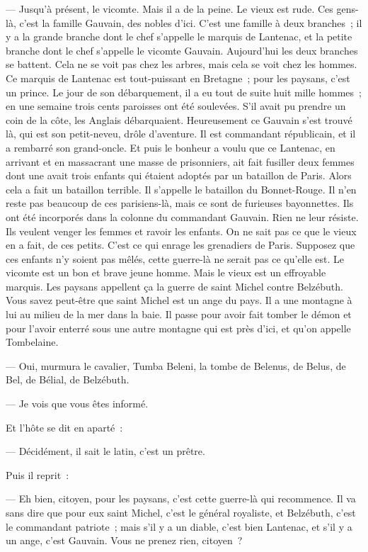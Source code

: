 \documentclass[french,twoside]{book} %
\begin{document}
— Jusqu’à présent, le vicomte. Mais il a de la peine. Le vieux est rude. Ces gens-là, c’est la famille Gauvain, des nobles d’ici. C’est une famille à deux branches ; il y a la grande branche dont le chef s’appelle le marquis de Lantenac, et la petite branche dont le chef s’appelle le vicomte Gauvain. Aujourd’hui les deux branches se battent. Cela ne se voit pas chez les arbres, mais cela se voit chez les hommes. Ce marquis de Lantenac est tout-puissant en Bretagne ; pour les paysans, c’est un prince. Le jour de son débarquement,  il a eu tout de suite huit mille hommes ; en une semaine trois cents paroisses ont été soulevées. S’il avait pu prendre un coin de la côte, les Anglais débarquaient. Heureusement ce Gauvain s’est trouvé là, qui est son petit-neveu, drôle d’aventure. Il est commandant républicain, et il a rembarré son grand-oncle. Et puis le bonheur a voulu que ce Lantenac, en arrivant et en massacrant une masse de prisonniers, ait fait fusiller deux femmes dont une avait trois enfants qui étaient adoptés par un bataillon de Paris. Alors cela a fait un bataillon terrible. Il s’appelle le bataillon du Bonnet-Rouge. Il n’en reste pas beaucoup de ces parisiens-là, mais ce sont de furieuses bayonnettes. Ils ont été incorporés dans la colonne du commandant Gauvain. Rien ne leur résiste. Ils veulent venger les femmes et ravoir les enfants. On ne sait pas ce que le vieux en a fait, de ces petits. C’est ce qui enrage les grenadiers de Paris. Supposez que ces enfants n’y soient pas mêlés, cette guerre-là ne serait pas ce qu’elle est. Le vicomte est un bon et brave jeune homme. Mais le vieux est un effroyable marquis. Les paysans appellent ça la guerre de saint Michel contre Belzébuth. Vous savez peut-être que saint Michel est un ange du pays. Il a une montagne à lui au milieu de la mer dans la baie. Il passe pour avoir fait tomber le démon et pour l’avoir enterré sous une autre montagne qui est près d’ici, et qu’on appelle Tombelaine.\par
— Oui, murmura le cavalier, Tumba Beleni, la tombe de Belenus, de Belus, de Bel, de Bélial, de Belzébuth.\par
 — Je vois que vous êtes informé.\par
Et l’hôte se dit en aparté :\par
— Décidément, il sait le latin, c’est un prêtre.\par
Puis il reprit :\par
— Eh bien, citoyen, pour les paysans, c’est cette guerre-là qui recommence. Il va sans dire que pour eux saint Michel, c’est le général royaliste, et Belzébuth, c’est le commandant patriote ; mais s’il y a un diable, c’est bien Lantenac, et s’il y a un ange, c’est Gauvain. Vous ne prenez rien, citoyen ?\par
\end{document}
